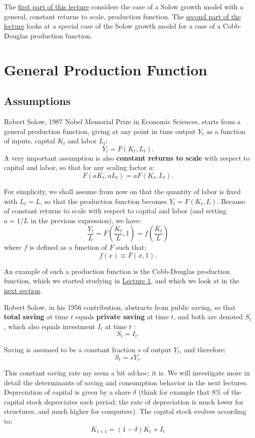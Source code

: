 \documentclass[]{book}
\theoremstyle{definition}
\theoremstyle{definition}
\theoremstyle{definition}
\theoremstyle{remark}
\begin{document}
The \protect\hyperlink{general-production-f}{first part of this lecture}
considers the case of a Solow growth model with a general, constant
returns to scale, production function. The
\protect\hyperlink{cobb}{second part of the lecture} looks at a special
case of the Solow growth model for a case of a Cobb-Douglas production
function.

\hypertarget{general-production-f}{\section{General Production
Function}\label{general-production-f}}

\subsection{Assumptions}\label{assumptions}

Robert Solow, 1987 Nobel Memorial Prize in Economic Sciences, starts
from a general production function, giving at any point in time output
\(Y_t\) as a function of inputs, capital \(K_t\) and labor \(L_t\):
\[Y_t=F\left(K_t,L_t\right).\] A very important assumption is also
\textbf{constant returns to scale} with respect to capital and labor, so
that for any scaling factor \(a\): \[F(aK_t, aL_t) = aF(K_t, L_t).\]

For simplicity, we shall assume from now on that the quantity of labor
is fixed with \(L_t=L\), so that the production function becomes
\(Y_t=F(K_t, L)\). Because of constant returns to scale with respect to
capital and labor (and setting \(a=1/L\) in the previous expression), we
have:
\[\frac{Y_t}{L}=F\left(\frac{K_t}{L},1\right)=f\left(\frac{K_t}{L}\right)\]
where \(f\) is defined as a function of \(F\) such that:
\[f(x)\equiv F(x,1).\]

An example of such a production function is the Cobb-Douglas production
function, which we started studying in
\protect\hyperlink{intro-cobb}{Lecture 1}, and which we look at in the
\protect\hyperlink{cobb}{next section}.

Robert Solow, in his 1956 contribution, abstracts from public saving, so
that \textbf{total saving} at time \(t\) equals \textbf{private saving}
at time \(t\), and both are denoted \(S_{t}\), which also equals
investment \(I_{t}\) at time \(t\) : \[S_{t}=I_{t}.\]

Saving is assumed to be a constant fraction \(s\) of output \(Y_{t}\),
and therefore: \[S_{t}=sY_{t}.\]

This constant saving rate my seem a bit ad-hoc; it is. We will
investigate more in detail the determinants of saving and consumption
behavior in the next lectures. Depreciation of capital is given by a
share \(\delta\) (think for example that 8\% of the capital stock
depreciates each period; the rate of depreciation is much lower for
structures, and much higher for computers). The capital stock evolves
according to: \[K_{t+1}=\left(1-\delta\right)K_{t}+I_{t}\]
\end{document}

